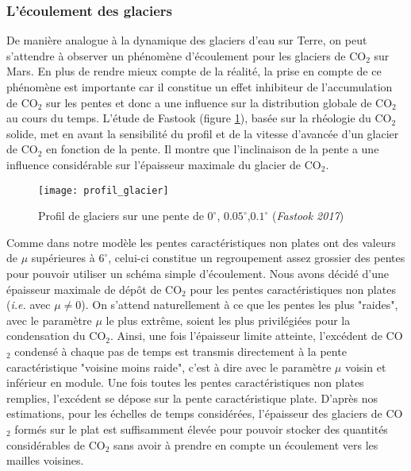 \documentclass[11pt,a4paper]{article}
\begin{document}
\subsubsection{L'écoulement des glaciers}
De manière analogue à la dynamique des glaciers d'eau sur Terre, on peut s'attendre à observer un phénomène d'écoulement pour les glaciers de CO$_2$ sur Mars. En plus de rendre mieux compte de la réalité, la prise en compte de ce phénomène est importante car il constitue un effet inhibiteur de l'accumulation de CO$_2$ sur les pentes et donc a une influence sur la distribution globale de CO$_2$ au cours du temps. L'étude de Fastook \citep{Fast:17} (figure \ref{profil_glacier}), basée sur la rhéologie du CO$_2$ solide, met en avant la sensibilité du profil et de la vitesse d'avancée d'un glacier de CO$_2$ en fonction de la pente. Il montre que l'inclinaison de la pente a une influence considérable sur l'épaisseur maximale du glacier de CO$_2$. \\

\begin{figure}[h!]
\begin{center}
\texttt{[image: profil\_glacier]}
\caption{Profil de glaciers sur une pente de $0^\circ$, $0.05^\circ$,$0.1^\circ$ (\emph{Fastook 2017})}
\label{profil_glacier}
\end{center}
\end{figure}

Comme dans notre modèle les pentes caractéristiques non plates ont des valeurs de $\mu$ supérieures à $6^\circ$, celui-ci constitue un regroupement assez grossier des pentes pour pouvoir utiliser un schéma simple d'écoulement. Nous avons décidé d'une épaisseur maximale de dépôt de CO$_2$ pour les pentes caractéristiques non plates (\emph{i.e.} avec $\mu \neq 0$). On s'attend naturellement à ce que les pentes les plus "raides", avec le paramètre $\mu$ le plus extrême, soient les plus privilégiées pour la condensation du CO$_2$. Ainsi, une fois l'épaisseur limite atteinte,  l'excédent de CO$_2$ condensé  à chaque pas de temps est transmis directement à la pente caractéristique "voisine moins raide", c'est à dire avec le paramètre $\mu$ voisin et inférieur en module. Une fois toutes les pentes caractéristiques non plates remplies, l'excédent se dépose sur la pente caractéristique plate. D'après nos estimations, pour les échelles de temps considérées, l'épaisseur des glaciers de CO$_2$ formés sur le plat est suffisamment élevée pour pouvoir stocker des quantités considérables de CO$_2$ sans avoir à prendre en compte un écoulement vers les mailles voisines.
\end{document}
